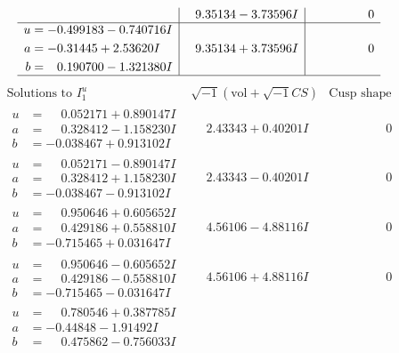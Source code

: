 \documentclass[1p]{elsarticle_modified}
\theoremstyle{definition}
\newcommand{\I}{\sqrt{-1}}
\begin{document}
$$\begin{array}{c|c|c}
 & \phantom{-}9.35134 - 3.73596 I & \phantom{-0.000000 } 0 \\ \hline\begin{aligned}
u &= -0.499183 - 0.740716 I \\
a &= -0.31445 + 2.53620 I \\
b &= \phantom{-}0.190700 - 1.321380 I\end{aligned}
 & \phantom{-}9.35134 + 3.73596 I & \phantom{-0.000000 } 0\\
 \hline 
 \end{array}$$\newpage$$\begin{array}{c|c|c}  
\text{Solutions to }I^u_{1}& \I (\text{vol} + \sqrt{-1}CS) & \text{Cusp shape}\\
 \hline 
\begin{aligned}
u &= \phantom{-}0.052171 + 0.890147 I \\
a &= \phantom{-}0.328412 - 1.158230 I \\
b &= -0.038467 + 0.913102 I\end{aligned}
 & \phantom{-}2.43343 + 0.40201 I & \phantom{-0.000000 } 0 \\ \hline\begin{aligned}
u &= \phantom{-}0.052171 - 0.890147 I \\
a &= \phantom{-}0.328412 + 1.158230 I \\
b &= -0.038467 - 0.913102 I\end{aligned}
 & \phantom{-}2.43343 - 0.40201 I & \phantom{-0.000000 } 0 \\ \hline\begin{aligned}
u &= \phantom{-}0.950646 + 0.605652 I \\
a &= \phantom{-}0.429186 + 0.558810 I \\
b &= -0.715465 + 0.031647 I\end{aligned}
 & \phantom{-}4.56106 - 4.88116 I & \phantom{-0.000000 } 0 \\ \hline\begin{aligned}
u &= \phantom{-}0.950646 - 0.605652 I \\
a &= \phantom{-}0.429186 - 0.558810 I \\
b &= -0.715465 - 0.031647 I\end{aligned}
 & \phantom{-}4.56106 + 4.88116 I & \phantom{-0.000000 } 0 \\ \hline\begin{aligned}
u &= \phantom{-}0.780546 + 0.387785 I \\
a &= -0.44848 - 1.91492 I \\
b &= \phantom{-}0.475862 - 0.756033 I\end{aligned}

\end{array}$$
\end{document}

